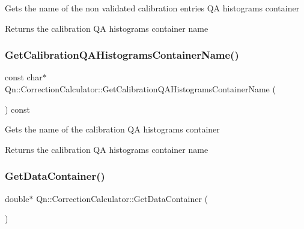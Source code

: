Gets the name of the non validated calibration entries QA histograms container \begin{DoxyReturn}{Returns}
the calibration QA histograms container name 
\end{DoxyReturn}
\mbox{\label{classQn_1_1CorrectionCalculator_a4b36448df2483b65b25c5f8c2023cf1a}} 
\subsubsection{\texorpdfstring{Get\+Calibration\+Q\+A\+Histograms\+Container\+Name()}{GetCalibrationQAHistogramsContainerName()}}
{\footnotesize\ttfamily const char$\ast$ Qn\+::\+Correction\+Calculator\+::\+Get\+Calibration\+Q\+A\+Histograms\+Container\+Name (\begin{DoxyParamCaption}{ }\end{DoxyParamCaption}) const\hspace{0.3cm}{\ttfamily [inline]}}

Gets the name of the calibration QA histograms container \begin{DoxyReturn}{Returns}
the calibration QA histograms container name 
\end{DoxyReturn}
\mbox{\label{classQn_1_1CorrectionCalculator_aee791a60fb690d80912719312abb2a15}} 
\subsubsection{\texorpdfstring{Get\+Data\+Container()}{GetDataContainer()}}
{\footnotesize\ttfamily double$\ast$ Qn\+::\+Correction\+Calculator\+::\+Get\+Data\+Container (\begin{DoxyParamCaption}{ }\end{DoxyParamCaption})\hspace{0.3cm}{\ttfamily [inline]}}

